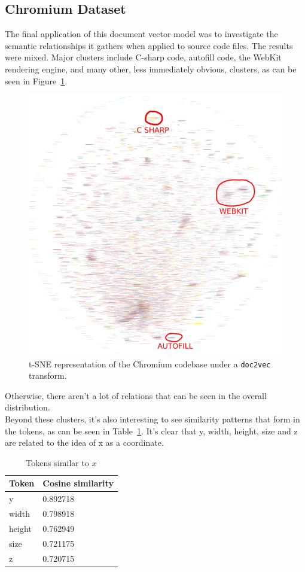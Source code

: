 \documentclass[11pt]{article}
\begin{document}
\subsection*{Chromium Dataset}
The final application of this document vector model was to investigate the
semantic relationships it gathers when applied to source code files. The
results were mixed. Major clusters include C-sharp code, autofill code, the
WebKit rendering engine, and many other, less immediately obvious, clusters,
as can be seen in Figure~\ref{fig:tsne}.
\begin{figure}
  \centering
    \includegraphics[width=0.5\linewidth]{chromium-tsne.png}
  \caption{t-SNE representation of the Chromium codebase under a
           \texttt{doc2vec} transform.}
  \label{fig:tsne}
\end{figure}
Otherwise, there aren't a lot of relations that can be seen in the overall
distribution.\\
Beyond these clusters, it's also interesting to see similarity patterns that
form in the tokens, as can be seen in Table~\ref{tab:chromium}. It's clear that
y, width, height, size and z are related to the idea of x as a coordinate.
\begin{table}[h]
  \begin{center}
    \begin{tabular}{l l}
      Token & Cosine similarity\\
      \hline
      y & 0.892718\\
      width & 0.798918\\
      height & 0.762949\\
      size & 0.721175\\
      z & 0.720715\\
    \end{tabular}
  \caption{Tokens similar to $x$}
  \label{tab:chromium}
  \end{center}
\end{table}
\end{document}

